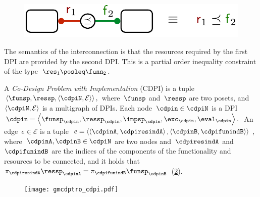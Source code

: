 \begin{figure}[h]
    \centering
    \includegraphics[scale=0.33]{papers/uncertainty/unc_connection.pdf}
    \caption{\label{fig:connection}}
\end{figure}


\noindent The semantics of the interconnection is that the resources
required by the first DPI are provided by the second DPI. This is
a partial order inequality constraint of the type~$\res_{1}\posleq\funn_{2}$.

\begin{definition}
\label{def:cdpi}A \emph{Co-Design Problem with Implementation} (CDPI)
is a tuple $\left\langle \funsp,\ressp,\left\langle \cdpiN,\mathcal{E}\right\rangle \right\rangle ,$
where~$\funsp$ and~$\ressp$ are two posets, and~$\left\langle \cdpiN,\mathcal{E}\right\rangle $
is a\emph{ }multigraph of DPIs. Each node~$\cdpin\in\cdpiN$ is a
DPI $\cdpin=\left\langle \funsp_{\cdpin},\ressp_{\cdpin},\impsp_{\cdpin},\exc_{\cdpin},\eval_{\cdpin}\right\rangle .$
An edge~$e\in\mathcal{E}$ is a tuple $e=\left\langle \left\langle \cdpinA,\cdpiresindA\right\rangle ,\left\langle \cdpinB,\cdpifunindB\right\rangle \right\rangle $,
where~$\cdpinA,\cdpinB\in\cdpiN$ are two nodes and~$\cdpiresindA$
and~$\cdpifunindB$ are the indices of the components of the functionality
and resources to be connected, and it holds that~$\pi_{\cdpiresindA}\ressp_{\cdpinA}=\pi_{\cdpifunindB}\funsp_{\cdpinB}$~(\cref{fig:mcdps}). 

\begin{figure}[h]
    \centering
    \texttt{[image: gmcdptro\_cdpi.pdf]}
    \caption{\label{fig:mcdps}}
\end{figure}


\end{definition}

